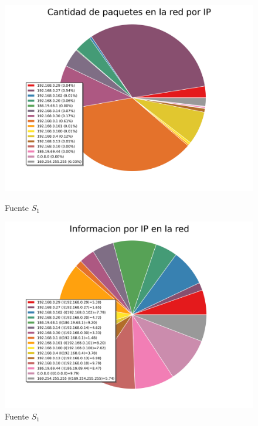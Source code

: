 \begin{figure}[ht!]
  \centering
  \begin{minipage}[b]{0.48\textwidth}
    \includegraphics[width=\textwidth]{graficos/red_domestica_pie_arp.png}
    \caption{Fuente $S_1$}
    \label{fig:red_domestica_pie_arp}
  \end{minipage}
  \hfill
  \begin{minipage}[b]{0.48\textwidth}
    \includegraphics[width=\textwidth]{graficos/red_domestica_pie_arp_information.png}
    \caption{Fuente $S_1$}
    \label{fig:red_domestica_pie_arp_information}
  \end{minipage}
\end{figure}

